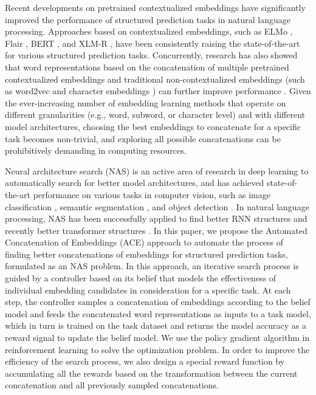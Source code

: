 \documentclass{article} \usepackage{iclr2021_conference,times}
\begin{document}
Recent developments on pretrained contextualized embeddings have significantly improved the performance of structured prediction tasks in natural language processing. Approaches based on contextualized embeddings, such as ELMo \citep{peters-etal-2018-deep}, Flair \citep{akbik-etal-2018-contextual}, BERT \citep{devlin-etal-2019-bert}, and XLM-R \citep{conneau-etal-2020-unsupervised}, have been consistently raising the state-of-the-art for various structured prediction tasks. Concurrently, research has also showed that word representations based on the concatenation of multiple pretrained contextualized embeddings and traditional non-contextualized embeddings (such as word2vec \citep{mikolov2013distributed} and character embeddings \citep{santos2014learning}) can further improve performance \citep{peters-etal-2018-deep,akbik-etal-2018-contextual,strakova-etal-2019-neural,he2019establishing}. Given the ever-increasing number of embedding learning methods that operate on different granularities (e.g., word, subword, or character level) and with different model architectures, choosing the best embeddings to concatenate for a specific task becomes non-trivial, and exploring all possible concatenations can be prohibitively demanding in computing resources.



Neural architecture search (NAS) is an active area of research in deep learning to automatically search for better model architectures, and has achieved state-of-the-art performance on various tasks in computer vision, such as image classification \citep{real2019regularized}, semantic segmentation \citep{liu2019auto}, and object detection \citep{ghiasi2019fpn}. In natural language processing, NAS has been successfully applied to find better RNN structures  \citep{zoph2016neural,pham2018efficient} and recently better transformer structures \citep{so2019evolved,zhu2020autotrans}.  In this paper, we propose the Automated Concatenation of Embeddings (ACE) approach to automate the process of finding better concatenations of embeddings for structured prediction tasks, formulated as an NAS problem. In this approach, an iterative search process is guided by a controller based on its belief that models the effectiveness of individual embedding candidates in consideration for a specific task. At each step, the controller samples a concatenation of embeddings according to the belief model and feeds the concatenated word representations as inputs to a task model, which in turn is trained on the task dataset and returns the model accuracy as a reward signal to update the belief model. We use the policy gradient algorithm \citep{williams1992simple} in reinforcement learning \citep{sutton2018reinforcement} to solve the optimization problem. In order to improve the efficiency of the search process, we also design a special reward function by accumulating all the rewards based on the transformation between the current concatenation and all previously sampled concatenations. 
\end{document}
